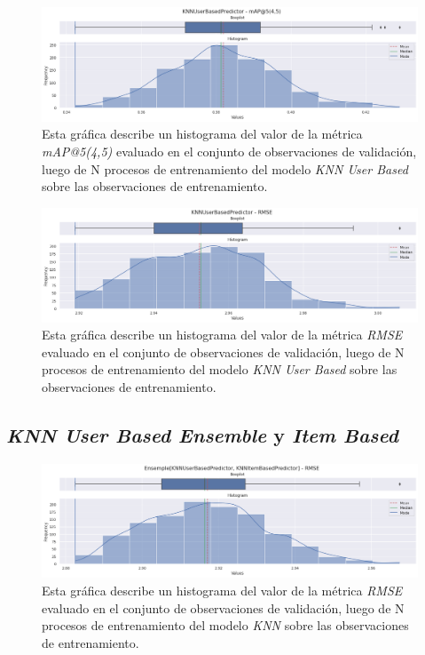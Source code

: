 \documentclass[11pt,a4paper,twoside]{thesis}
\begin{document}
\begin{figure}[!htb]
	\centering
	\includegraphics[width=15cm]{./images/metrics-knn-user-based-mapk.png}
	\caption{Esta gráfica describe un histograma del valor de la métrica \textit{mAP@5(4,5)} evaluado en el conjunto de observaciones de validación, luego de N procesos de entrenamiento del modelo \textit{KNN User Based} sobre las observaciones de entrenamiento.}
\end{figure}

\begin{figure}[!htb]
	\centering
	\includegraphics[width=15cm]{./images/metrics-knn-user-based-RMSE.png}
	\caption{Esta gráfica describe un histograma del valor de la métrica \textit{RMSE} evaluado en el conjunto de observaciones de validación, luego de N procesos de entrenamiento del modelo \textit{KNN User Based} sobre las observaciones de entrenamiento.}
\end{figure}

\clearpage

\subsection{\textit{KNN User Based Ensemble} y \textit{Item Based}}

\begin{figure}[!htb]
	\centering
	\includegraphics[width=15cm]{./images/metrics-knn-ensemple-RMSE.png}
	\caption{Esta gráfica describe un histograma del valor de la métrica \textit{RMSE} evaluado en el conjunto de observaciones de validación, luego de N procesos de entrenamiento del modelo \textit{KNN} sobre las observaciones de entrenamiento.}
\end{figure}
\end{document}
